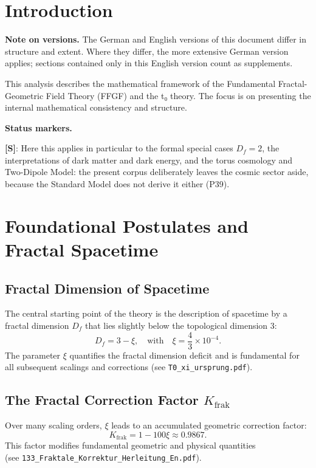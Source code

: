 \section{Introduction}

	\medskip\noindent\textbf{Note on versions.} The German and English versions of this document differ in structure and extent. Where they differ, the more extensive German version applies; sections contained only in this English version count as supplements.

	This analysis describes the mathematical framework of the Fundamental Fractal-Geometric Field Theory (FFGF) and the t₀ theory. The focus is on presenting the internal mathematical consistency and structure.

	\medskip\noindent\textbf{Status markers.}
	

	\noindent \textbf{[S]}: Here this applies in particular to the formal special cases $D_f = 2$, the interpretations of dark matter and dark energy, and the torus cosmology and Two-Dipole Model: the present corpus deliberately leaves the cosmic sector aside, because the Standard Model does not derive it either (P39).
	
	\section{Foundational Postulates and Fractal Spacetime}
	\subsection{Fractal Dimension of Spacetime}
	The central starting point of the theory is the description of spacetime by a fractal dimension \(D_f\) that lies slightly below the topological dimension 3:
	\begin{equation}
		D_f = 3 - \xi, \quad \text{with} \quad \xi = \frac{4}{3} \times 10^{-4}.
		\label{eq:fractal_dimension}
	\end{equation}
	The parameter \(\xi\) quantifies the fractal dimension deficit and is fundamental for all subsequent scalings and corrections
	(see \texttt{T0\_xi\_ursprung.pdf}).
	
	\subsection{The Fractal Correction Factor \(K_{\text{frak}}\)}
	Over many scaling orders, \(\xi\) leads to an accumulated geometric correction factor:
	\begin{equation}
		K_{\text{frak}} = 1 - 100\xi \approx 0.9867.
		\label{eq:K_frak}
	\end{equation}
	This factor modifies fundamental geometric and physical quantities \\
	(see \texttt{133\_Fraktale\_Korrektur\_Herleitung\_En.pdf}).
	
